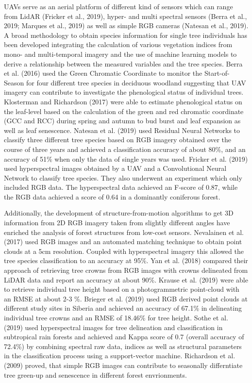 \documentclass[]{article}
\begin{document}
UAVs serve as an aerial platform of different kind of sensors which can
range from LidAR (Fricker et al., 2019), hyper- and multi spectral
sensors (Berra et al., 2019; Marques et al., 2019) as well as simple RGB
cameras (Natesan et al., 2019). A broad methodology to obtain species
information for single tree individuals has been developed integrating
the calculation of various vegetation indices from mono- and
multi-temporal imagery and the use of machine learning models to derive
a relationship between the measured variables and the tree species.
Berra et al. (2016) used the Green Chromatic Coordinate to monitor the
Start-of-Season for four different tree species in deciduous woodland
suggesting that UAV imagery can contribute to investigate the
phenological status of individual trees. Klosterman and Richardson
(2017) were able to estimate phenological status on the leaf-level based
on the calculation of the green and red chromatic coordinate (GCC and
RCC) during spring and autumn to bud burst and leaf expansion as well as
leaf senescence. Natesan et al. (2019) used Residual Neural Networks to
classify three different tree species based on RGB imagery obtained over
the course of three years and achieved a classification accuracy of
about 80\%, and an accuracy of 51\% when only the data of single years
was used. Fricker et al. (2019) used hyperspectral images obtained by a
UAV and a Convolutional Neural Network to classify tree species. They
also underwent an experiment which only included RGB data. The
hyperspectral data achieved an F-score of 0.87, while the RGB data
achieved a score of 0.64 in a dominantly coniferous forest.

Additionally, the development of structure-from-motion algorithms to get
3D information from 2D RGB imagery taken from slightly different angles
have enriched the analysis of forest structures from low-cost sensors.
Nevalainen et al. (2017) used RGB images and an automated matching
technique to obtain point clouds at a 5cm resolution. Coupled with
hyperspectral imagery this allowed the tree species classification to an
accuracy at 95\%. Yan et al. (2018) compared their approach of
retrieving tree crowns from RGB images with crowns delineated from LiDAR
data and report an accuracy at about 90\%. Krause et al. (2019) were
able to retrieve individual tree height based on a photogrammetric
point-cloud with an RMSE at about 2-3 \%. Brieger et al. (2019) used RGB
derived point clouds at different study sites in Siberia and achieved an
accuracy of 67.1\% in delineating individual tree crowns and an RMSE of
18.46\% for tree height. Sothe et al. (2019) used hyperspectral images
for tree delineation and classification in subtropical rain forests and
achieved and Kappa score of 0.7 (overall accuracy of 72.4\%) by
combining spectral raw data, indices as well as structural parameters in
the classification process using a support-vector machine. Richardson et
al. (2009) proved, that simple RGB images can contribute to seasonally
differntiate tree green-up and senescence in different forest
envrionments.
\end{document}
